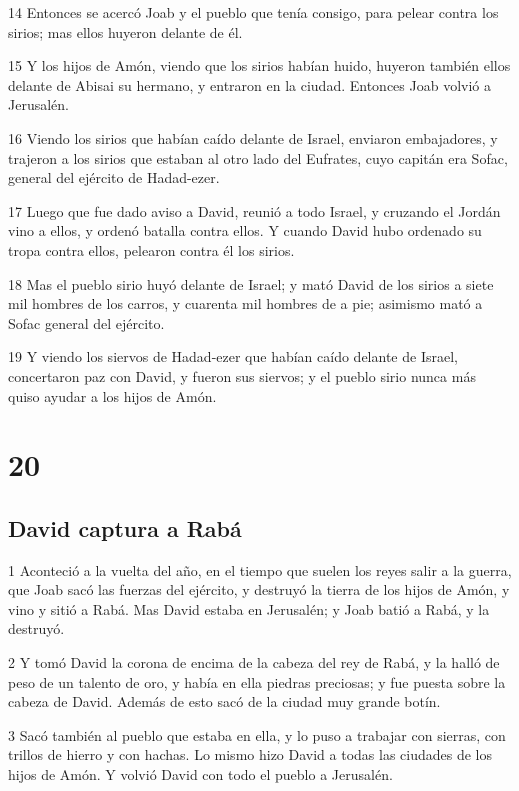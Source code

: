 \par 14 Entonces se acercó Joab y el pueblo que tenía consigo, para pelear contra los sirios; mas ellos huyeron delante de él.
\par 15 Y los hijos de Amón, viendo que los sirios habían huido, huyeron también ellos delante de Abisai su hermano, y entraron en la ciudad. Entonces Joab volvió a Jerusalén.
\par 16 Viendo los sirios que habían caído delante de Israel, enviaron embajadores, y trajeron a los sirios que estaban al otro lado del Eufrates, cuyo capitán era Sofac, general del ejército de Hadad-ezer.
\par 17 Luego que fue dado aviso a David, reunió a todo Israel, y cruzando el Jordán vino a ellos, y ordenó batalla contra ellos. Y cuando David hubo ordenado su tropa contra ellos, pelearon contra él los sirios.
\par 18 Mas el pueblo sirio huyó delante de Israel; y mató David de los sirios a siete mil hombres de los carros, y cuarenta mil hombres de a pie; asimismo mató a Sofac general del ejército.
\par 19 Y viendo los siervos de Hadad-ezer que habían caído delante de Israel, concertaron paz con David, y fueron sus siervos; y el pueblo sirio nunca más quiso ayudar a los hijos de Amón.

\chapter{20}

\section*{David captura a Rabá}

\par 1 Aconteció a la vuelta del año, en el tiempo que suelen los reyes salir a la guerra, que Joab sacó las fuerzas del ejército, y destruyó la tierra de los hijos de Amón, y vino y sitió a Rabá. Mas David estaba en Jerusalén; y Joab batió a Rabá, y la destruyó.
\par 2 Y tomó David la corona de encima de la cabeza del rey de Rabá, y la halló de peso de un talento de oro,  y había en ella piedras preciosas; y fue puesta sobre la cabeza de David. Además de esto sacó de la ciudad muy grande botín.
\par 3 Sacó también al pueblo que estaba en ella, y lo puso a trabajar con sierras, con trillos de hierro y con hachas. Lo mismo hizo David a todas las ciudades de los hijos de Amón. Y volvió David con todo el pueblo a Jerusalén.


